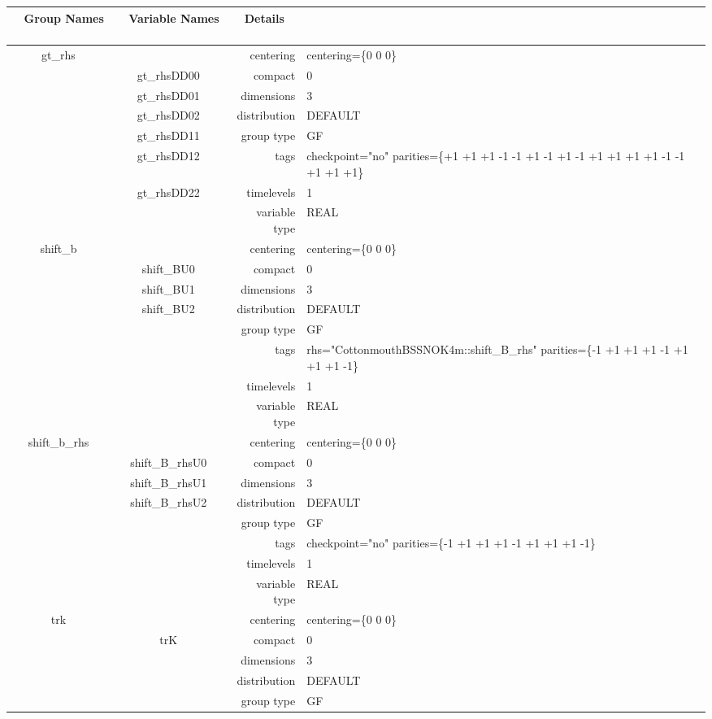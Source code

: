 \documentclass{article}
\begin{document}
\begin{tabular*}{150mm}{|c|c@{\extracolsep{\fill}}|rl|} \hline 
~ {\bf Group Names} ~ & ~ {\bf Variable Names} ~  &{\bf Details} ~ & ~ \\ 
\hline 
gt\_rhs &  & centering & centering=\{0 0 0\} \\ 
 & gt\_rhsDD00 & compact & 0 \\ 
 & gt\_rhsDD01 & dimensions & 3 \\ 
 & gt\_rhsDD02 & distribution & DEFAULT \\ 
 & gt\_rhsDD11 & group type & GF \\ 
 & gt\_rhsDD12 & tags & checkpoint="no" parities=\{+1 +1 +1  -1 -1 +1  -1 +1 -1  +1 +1 +1  +1 -1 -1  +1 +1 +1\} \\ 
 & gt\_rhsDD22 & timelevels & 1 \\ 
 &  & variable type & REAL \\ 
\hline 
shift\_b &  & centering & centering=\{0 0 0\} \\ 
 & shift\_BU0 & compact & 0 \\ 
 & shift\_BU1 & dimensions & 3 \\ 
 & shift\_BU2 & distribution & DEFAULT \\ 
 &  & group type & GF \\ 
 &  & tags & rhs="CottonmouthBSSNOK4m::shift\_B\_rhs" parities=\{-1 +1 +1  +1 -1 +1  +1 +1 -1\} \\ 
 &  & timelevels & 1 \\ 
 &  & variable type & REAL \\ 
\hline 
shift\_b\_rhs &  & centering & centering=\{0 0 0\} \\ 
 & shift\_B\_rhsU0 & compact & 0 \\ 
 & shift\_B\_rhsU1 & dimensions & 3 \\ 
 & shift\_B\_rhsU2 & distribution & DEFAULT \\ 
 &  & group type & GF \\ 
 &  & tags & checkpoint="no" parities=\{-1 +1 +1  +1 -1 +1  +1 +1 -1\} \\ 
 &  & timelevels & 1 \\ 
 &  & variable type & REAL \\ 
\hline 
trk &  & centering & centering=\{0 0 0\} \\ 
 & trK & compact & 0 \\ 
 &  & dimensions & 3 \\ 
 &  & distribution & DEFAULT \\ 
 &  & group type & GF \\ 

\end{tabular*}
\end{document}
